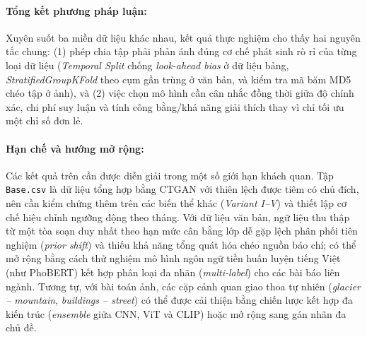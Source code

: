 \paragraph{Tổng kết phương pháp luận:} Xuyên suốt ba miền dữ liệu khác nhau, kết quả thực nghiệm cho thấy hai nguyên tắc chung: (1) phép chia tập phải phản ánh đúng cơ chế phát sinh rò rỉ của từng loại dữ liệu (\textit{Temporal Split} chống \textit{look-ahead bias} ở dữ liệu bảng, \textit{StratifiedGroupKFold} theo cụm gần trùng ở văn bản, và kiểm tra mã băm MD5 chéo tập ở ảnh), và (2) việc chọn mô hình cần cân nhắc đồng thời giữa độ chính xác, chi phí suy luận và tính công bằng/khả năng giải thích thay vì chỉ tối ưu một chỉ số đơn lẻ.

\paragraph{Hạn chế và hướng mở rộng:} Các kết quả trên cần được diễn giải trong một số giới hạn khách quan. Tập \texttt{Base.csv} là dữ liệu tổng hợp bằng CTGAN với thiên lệch được tiêm có chủ đích, nên cần kiểm chứng thêm trên các biến thể khác (\textit{Variant I--V}) và thiết lập cơ chế hiệu chỉnh ngưỡng động theo tháng. Với dữ liệu văn bản, ngữ liệu thu thập từ một tòa soạn duy nhất theo hạn mức cân bằng lớp dễ gặp lệch phân phối tiên nghiệm (\textit{prior shift}) và thiếu khả năng tổng quát hóa chéo nguồn báo chí; có thể mở rộng bằng cách thử nghiệm mô hình ngôn ngữ tiền huấn luyện tiếng Việt (như PhoBERT) kết hợp phân loại đa nhãn (\textit{multi-label}) cho các bài báo liên ngành. Tương tự, với bài toán ảnh, các cặp cảnh quan giao thoa tự nhiên (\textit{glacier -- mountain}, \textit{buildings -- street}) có thể được cải thiện bằng chiến lược kết hợp đa kiến trúc (\textit{ensemble} giữa CNN, ViT và CLIP) hoặc mở rộng sang gán nhãn đa chủ đề.

